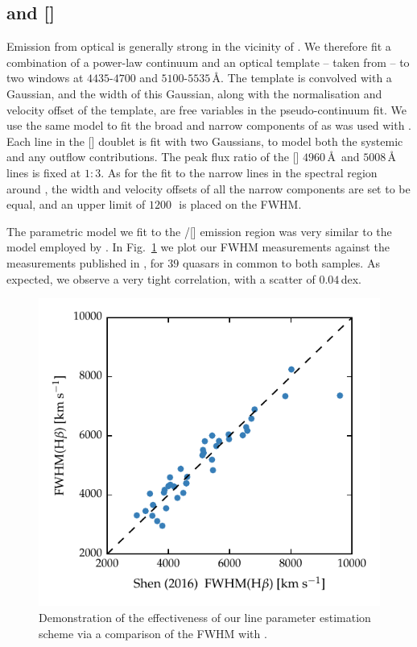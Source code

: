 \subsection{\hb and []}
\label{sec:hb}

Emission from optical  is generally strong in the vicinity of \hbns.
We therefore fit a combination of a power-law continuum and an optical  template -- taken from \citet{boroson92} -- to two windows at $4435$-$4700$ and $5100$-$5535$\,\AA. 
The  template is convolved with a Gaussian, and the width of this Gaussian, along with the normalisation and velocity offset of the  template, are free variables in the pseudo-continuum fit.
We use the same model to fit the broad and narrow components of \hb as was used with \hans. 
Each line in the [] doublet is fit with two Gaussians, to model both the systemic and any outflow contributions. 
The peak flux ratio of the [] $4960$\,\AA\, and $5008$\,\AA\, lines is fixed at $1:3$. 
As for the fit to the narrow lines in the spectral region around \hans, the width and velocity offsets of all the narrow components are set to be equal, and an upper limit of $1200$\,\kms\, is placed on the FWHM. 

The parametric model we fit to the \hbns/[] emission region was very similar to the model employed by \citet{shen16a}. 
In Fig.~\ref{fig:shen_comparison_hb} we plot our \hb FWHM measurements against the measurements published in \citet{shen16a}, for $39$ quasars in common to both samples. 
As expected, we observe a very tight correlation, with a scatter of $0.04$\,dex. 

\begin{figure}
    \centering 
    \includegraphics[width=0.8\linewidth]{figures/chapter03/shen_comparison_hb.pdf} 
    \caption{Demonstration of the effectiveness of our line parameter estimation scheme via a comparison of the \hb FWHM with \citet{shen16a}.} 
    \label{fig:shen_comparison_hb}
\end{figure}

